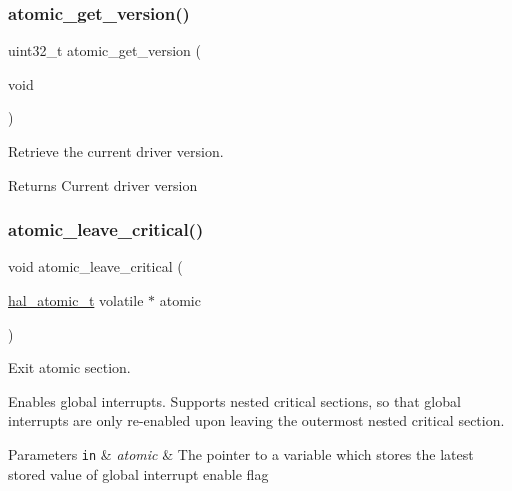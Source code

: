 \subsubsection{\texorpdfstring{atomic\+\_\+get\+\_\+version()}{atomic\_get\_version()}}
{\footnotesize\ttfamily uint32\+\_\+t atomic\+\_\+get\+\_\+version (\begin{DoxyParamCaption}\item[{void}]{ }\end{DoxyParamCaption})}



Retrieve the current driver version. 

\begin{DoxyReturn}{Returns}
Current driver version 
\end{DoxyReturn}
\mbox{\label{group__doc__driver__hal__helper__atomic_gaef0ccaa2438aca5ea074b36252d65990}} 
\subsubsection{\texorpdfstring{atomic\+\_\+leave\+\_\+critical()}{atomic\_leave\_critical()}}
{\footnotesize\ttfamily void atomic\+\_\+leave\+\_\+critical (\begin{DoxyParamCaption}\item[{\hyperlink{group__doc__driver__hal__helper__atomic_ga6b3a0c9eea25111ac1877e0302e2fe1c}{hal\+\_\+atomic\+\_\+t} volatile $\ast$}]{atomic }\end{DoxyParamCaption})}



Exit atomic section. 

Enables global interrupts. Supports nested critical sections, so that global interrupts are only re-\/enabled upon leaving the outermost nested critical section.


\begin{DoxyParams}[1]{Parameters}
\mbox{\tt in}  & {\em atomic} & The pointer to a variable which stores the latest stored value of global interrupt enable flag \\
\hline
\end{DoxyParams}
